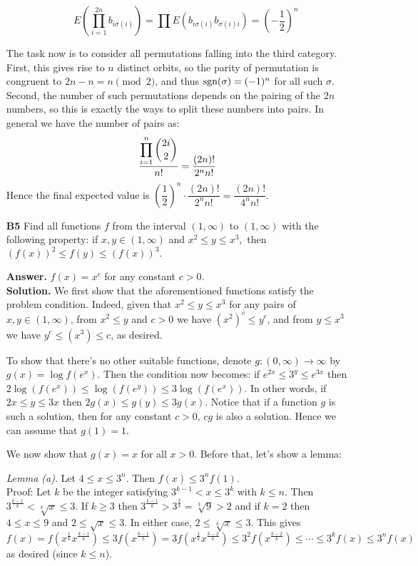\documentclass[11pt,a4paper]{article}
\newcommand{\<}{\langle}
\renewcommand{\>}{\rangle}
\begin{document}
\begin{enumerate}
\begin{enumerate}
		\[E(\prod_{i=1}^{2n}b_{i\sigma(i)})=\prod E(b_{i\sigma(i)}b_{\sigma(i)i})=\left(-\frac 12\right)^n\]
	\end{enumerate}
    The task now is to consider all permutations falling into the third category. First, this gives rise to $n$ distinct orbits, so the parity of permutation is congruent to $2n-n=n\pmod{2}$, and thus $\text{sgn}(\sigma)=(-1)^n$ for all such $\sigma$. Second, the number of such permutations depends on the pairing of the $2n$ numbers, so this is exactly the ways to split these numbers into pairs. In general we have the number of pairs as: 
    \[\frac{\displaystyle\prod_{i=1}^n\dbinom{2i}{2}}{n!}=\dfrac{(2n)!}{2^n n!}\]
    Hence the final expected value is $(\dfrac 12)^n \cdot \dfrac{(2n)!}{2^n n!}=\dfrac{(2n)!}{4^n n!}$. 
    
    \item[\textbf{B5}] Find all functions $f$ from the interval $(1,\infty)$ to $(1,\infty)$ with the following property: if $x,y\in(1,\infty)$ and $x^2\le y\le x^3,$ then $(f(x))^2\le f(y) \le (f(x))^3.$ 
    
    \textbf{Answer.} $f(x)=x^c$ for any constant $c>0$. \\
    \textbf{Solution.} We first show that the aforementioned functions satisfy the problem condition. Indeed, given that $x^2\le y\le x^3$ for any pairs of $x, y\in (1, \infty)$, from $x^2\le y$ and $c>0$ we have $(x^{2})^c\le y^c$, and from $y\le x^3$ we have $y^c\le (x^3)\le c$, as desired. 
    
    To show that there's no other suitable functions, denote $g:(0, \infty)\to\infty$ by $g(x)=\log f(e^x)$. Then the condition now becomes: if $e^{2x}\le 3^y\le e^{3x}$ then $2\log(f(e^x))\le \log(f(e^y))\le 3\log(f(e^x))$. In other words, if $2x\le y\le 3x$ then $2g(x)\le g(y)\le 3g(x)$. Notice that if a function $g$ is such a solution, then for any constant $c>0$, $cg$ is also a solution. Hence we can assume that $g(1)=1$. 
    
    We now show that $g(x)=x$ for all $x>0$. Before that, let's show a lemma: 
    
    \emph{Lemma (a)}. Let $4\le x\le 3^n$. Then $f(x)\le 3^nf(1)$. \\
    Proof: Let $k$ be the integer satisfying $3^{k-1}<x\le 3^k$ with $k\le n$. Then $3^{\frac{k-1}{k}}<\sqrt[k]{x}\le 3$. If $k\ge 3$ then $3^{\frac{k-1}{k}}>3^{\frac{2}{3}}=\sqrt[3]{9}>2$ and if $k=2$ then $4\le x\le 9$ and $2\le \sqrt{x}\le 3$. In either case, $2\le \sqrt[k]{x}\le 3$. This gives 
    \[
    f(x)=f(x^{\frac{1}{k}}x^{\frac{k-1}{k}})\le 3f(x^{\frac{k-1}{k}})
    =3f(x^{\frac{1}{k}}x^{\frac{k-2}{k}})\le 3^2f(x^{\frac{k-2}{k}})
    \le\cdots \le 3^kf(x)\le 3^nf(x)
    \]
    as desired (since $k\le n$). 
    

\end{enumerate}
\end{document}
